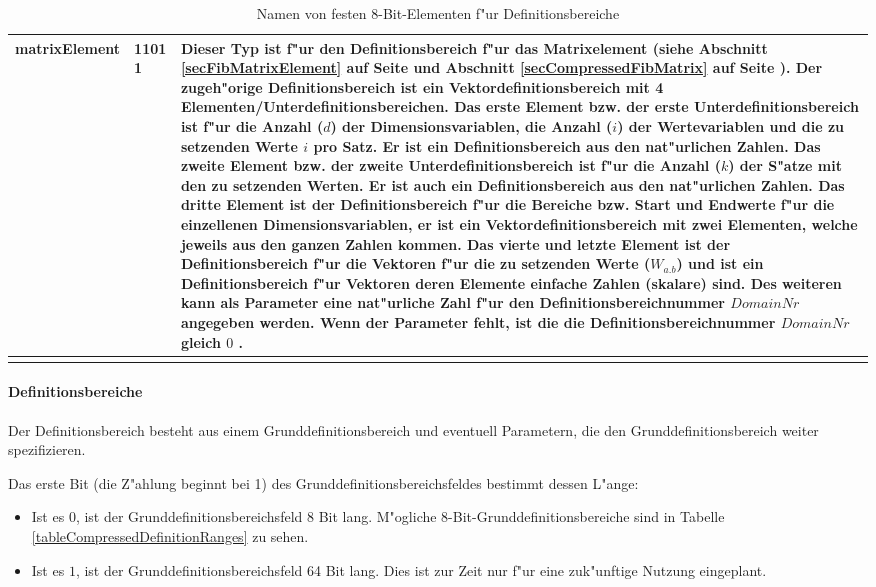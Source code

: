 \begin{center}
\begin{longtable}{|p{25mm}|p{15mm}|p{85mm}|}
	matrixElement & 1101 1 & Dieser Typ ist f"ur den Definitionsbereich f"ur das Matrixelement (siehe Abschnitt \ref{secFibMatrixElement} auf Seite \pageref{secFibMatrixElement} und Abschnitt \ref{secCompressedFibMatrix} auf Seite \pageref{secCompressedFibMatrix}). Der zugeh"orige Definitionsbereich ist ein Vektordefinitionsbereich mit 4 Elementen/Unterdefinitionsbereichen. Das erste Element bzw. der erste Unterdefinitionsbereich ist f"ur die Anzahl ($d$) der Dimensionsvariablen, die Anzahl ($i$) der Wertevariablen und die zu setzenden Werte $i$ pro Satz. Er ist ein Definitionsbereich aus den nat"urlichen Zahlen. Das zweite Element bzw. der zweite Unterdefinitionsbereich ist f"ur die Anzahl ($k$) der S"atze mit den zu setzenden Werten. Er ist auch ein Definitionsbereich aus den nat"urlichen Zahlen. Das dritte Element ist der Definitionsbereich f"ur die Bereiche bzw. Start und Endwerte f"ur die einzellenen Dimensionsvariablen, er ist ein Vektordefinitionsbereich mit zwei Elementen, welche jeweils aus den ganzen Zahlen kommen. Das vierte und letzte Element ist der Definitionsbereich f"ur die Vektoren f"ur die zu setzenden Werte ($W_{a.b}$) und ist ein Definitionsbereich f"ur Vektoren deren Elemente einfache Zahlen (skalare) sind. Des weiteren kann als Parameter eine nat"urliche Zahl f"ur den Definitionsbereichnummer $DomainNr$ angegeben werden. Wenn der Parameter fehlt, ist die die Definitionsbereichnummer $DomainNr$ gleich $0$ .\\\hline
\caption{Namen von festen 8-Bit-Elementen f"ur Definitionsbereiche}
\label{tableFixElementsForDefinitionRanges}
\end{longtable}
\end{center}



\paragraph{Definitionsbereiche}
\label{secCompressedDefinitionrangesArea}\label{parCompressedDomains}

Der Definitionsbereich besteht aus einem Grunddefinitionsbereich und eventuell Parametern, die den Grunddefinitionsbereich weiter spezifizieren.

\bigskip\noindent
Das erste Bit (die Z"ahlung beginnt bei 1) des Grunddefinitionsbereichsfeldes bestimmt dessen L"ange:
\begin{itemize}
 \item Ist es $0$, ist der Grunddefinitionsbereichsfeld 8 Bit lang. M"ogliche 8-Bit-Grunddefinitionsbereiche sind in Tabelle \ref{tableCompressedDefinitionRanges} zu sehen.
 \item Ist es $1$, ist der Grunddefinitionsbereichsfeld 64 Bit lang. Dies ist zur Zeit nur f"ur eine zuk"unftige Nutzung eingeplant.
\end{itemize}

